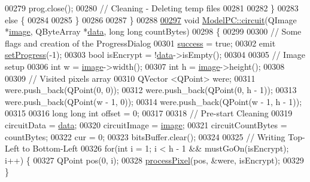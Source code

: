 \begin{DoxyCode}
00279         prog.close();
00280         \textcolor{comment}{// Cleaning - Deleting temp files}
00281 
00282     \}
00283     \textcolor{keywordflow}{else} \{
00284 
00285     \}
00286 
00287 \}
00288 
\mbox{\hyperlink{class_model_p_c_a1d0091062a0c836b283ec2f67411623b}{00297}} \textcolor{keywordtype}{void} \mbox{\hyperlink{class_model_p_c_a1d0091062a0c836b283ec2f67411623b}{ModelPC::circuit}}(QImage *\mbox{\hyperlink{namespacetests-setup_ad55b685280f549e15688a94cbb89f512}{image}}, QByteArray *\mbox{\hyperlink{namespace_errors_dict_setup_af570460846fb9f0c91abd308a095dcdc}{data}}, \textcolor{keywordtype}{long} \textcolor{keywordtype}{long} countBytes)
00298 \{
00299 
00300     \textcolor{comment}{// Some flags and creation of the ProgressDialog}
00301     \mbox{\hyperlink{class_model_p_c_a945ffbbc44a832b953c191debd448f4c}{success}} = \textcolor{keyword}{true};
00302     emit \mbox{\hyperlink{class_model_p_c_a25a4496e129e87ac96f12257a123b84f}{setProgress}}(-1);
00303     \textcolor{keywordtype}{bool} isEncrypt = !\mbox{\hyperlink{namespace_errors_dict_setup_af570460846fb9f0c91abd308a095dcdc}{data}}->isEmpty();
00304 
00305     \textcolor{comment}{// Image setup}
00306     \textcolor{keywordtype}{int} w = \mbox{\hyperlink{namespacetests-setup_ad55b685280f549e15688a94cbb89f512}{image}}->width();
00307     \textcolor{keywordtype}{int} h = \mbox{\hyperlink{namespacetests-setup_ad55b685280f549e15688a94cbb89f512}{image}}->height();
00308 
00309     \textcolor{comment}{// Visited pixels array}
00310     QVector <QPoint> were;
00311     were.push\_back(QPoint(0, 0));
00312     were.push\_back(QPoint(0, h - 1));
00313     were.push\_back(QPoint(w - 1, 0));
00314     were.push\_back(QPoint(w - 1, h - 1));
00315 
00316     \textcolor{keywordtype}{long} \textcolor{keywordtype}{long} \textcolor{keywordtype}{int} offset = 0;
00317 
00318     \textcolor{comment}{// Pre-start Cleaning}
00319     circuitData = \mbox{\hyperlink{namespace_errors_dict_setup_af570460846fb9f0c91abd308a095dcdc}{data}};
00320     circuitImage = \mbox{\hyperlink{namespacetests-setup_ad55b685280f549e15688a94cbb89f512}{image}};
00321     circuitCountBytes = countBytes;
00322     cur = 0;
00323     bitsBuffer.clear();
00324 
00325     \textcolor{comment}{// Writing Top-Left to Bottom-Left}
00326     \textcolor{keywordflow}{for}(\textcolor{keywordtype}{int} i = 1; i < h - 1 && mustGoOn(isEncrypt); i++) \{
00327         QPoint pos(0, i);
00328         \mbox{\hyperlink{class_model_p_c_a1171f9fe1550133dc9053a46b4e5bcfd}{processPixel}}(pos, &were, isEncrypt);
00329     \}

\end{DoxyCode}

